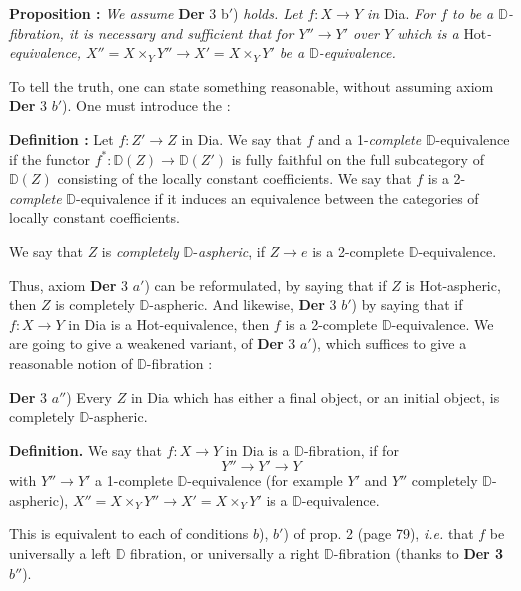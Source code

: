 \documentclass[11pt]{article}
\newcommand{\printedpage}[1]{\marginpar{\footnotesize p.~#1}}
\newcommand{\msp}[1]{\marginpar{\footnotesize [#1]}}
\newcommand{\Hot}{\textsf{Hot}}
\newcommand{\Dia}{\textsf{Dia}}
\newcommand{\DD}{\mathbb{D}}
\begin{document}
\textbf{Proposition :} \textit{We assume} \textbf{Der} 3 \textup{b}$'$) \textit{holds. Let $f : X \to Y$ in} \Dia. \textit{For $f$ to be a $\DD$-fibration, it is necessary and sufficient that for $Y'' \to Y'$ over $Y$ which is a} \Hot\textit{-equivalence, $X'' = X \times_Y Y'' \to X' = X \times_Y Y'$ be a $\DD$-equivalence.}

To tell the truth, one can state something reasonable, without assuming axiom \textbf{Der} 3 $b'$). One must introduce the :

\textbf{Definition :} Let $f : Z' \to Z$ in \Dia. We say that $f$ and a 1-\textit{complete} $\DD$-equivalence if the functor $f^* : \DD(Z) \to \DD(Z')$ is fully faithful on the full subcategory of $\DD(Z)$ consisting of the locally constant coefficients. We say that $f$ is a 2-\textit{complete} $\DD$-equivalence if it induces an equivalence between the categories of locally constant coefficients. %

\msp{page 100}
We say that $Z$ is \textit{completely} $\DD$-\textit{aspheric}, if $Z \to e$ is a 2-complete $\DD$-equivalence.

\printedpage{61}

Thus, axiom \textbf{Der} 3 $a'$) can be reformulated, by saying that if $Z$ is \Hot-aspheric, then $Z$ is completely $\DD$-aspheric. And likewise, \textbf{Der} 3 $b'$) by saying that if $f : X \to Y$ in \Dia{} is a \Hot-equivalence, then $f$ is a 2-complete $\DD$-equivalence. We are going to give a weakened variant, of \textbf{Der} 3 $a'$), which suffices to give a reasonable notion of $\DD$-fibration :

\textbf{Der} 3 $a''$) Every $Z$ in \Dia{} which has either a final object, or an initial object, is completely $\DD$-aspheric.

\textbf{Definition.} We say that $f : X \to Y$ in \Dia{} is a $\DD$-fibration, if for
\[
Y'' \longrightarrow Y' \longrightarrow Y
\]
with $Y'' \to Y'$ a 1-complete $\DD$-equivalence (for example $Y'$ and $Y''$ completely $\DD$-aspheric), $X'' = X \times_Y Y'' \longrightarrow X' = X \times_Y Y'$ is a $\DD$-equivalence. %

This is equivalent to each of conditions $b$), $b'$) of prop. 2 (page 79), \textit{i.e.} that $f$ be universally a left $\DD$ fibration, or universally a right $\DD$-fibration (thanks to \textbf{Der 3} $b''$). %
\end{document}
